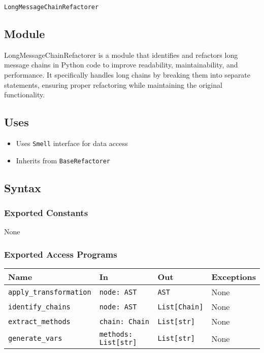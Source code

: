 \documentclass[12pt, titlepage]{article}
\begin{document}
\texttt{LongMessageChainRefactorer}

\subsection{Module}

LongMessageChainRefactorer is a module that identifies and refactors long message chains in Python code to improve readability, maintainability, and performance. It specifically handles long chains by breaking them into separate statements, ensuring proper refactoring while maintaining the original functionality.

\subsection{Uses}

\begin{itemize}
  \item Uses \texttt{Smell} interface for data access
  \item Inherits from \texttt{BaseRefactorer}
\end{itemize}

\subsection{Syntax}

\subsubsection{Exported Constants}
None

\subsubsection{Exported Access Programs}

\begin{center}
\begin{tabularx}{\linewidth}{|l|>{\raggedright\arraybackslash}X|p{1in}|p{1in}|}
\hline
\textbf{Name} & \textbf{In} & \textbf{Out} & \textbf{Exceptions} \\\hline
\texttt{apply\_transformation} & \texttt{node: AST} & \texttt{AST} & None \\\hline
\texttt{identify\_chains} & \texttt{node: AST} & \texttt{List[Chain]} & None \\\hline
\texttt{extract\_methods} & \texttt{chain: Chain} & \texttt{List[str]} & None \\\hline
\texttt{generate\_vars} & \texttt{methods: List[str]} & \texttt{List[str]} & None \\\hline
\end{tabularx}
\end{center}
\end{document}

